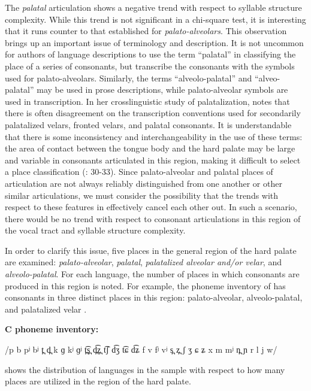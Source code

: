   The \textit{palatal} articulation shows a negative trend with respect to syllable structure complexity. While this trend is not significant in a chi-square test, it is interesting that it runs counter to that established for \textit{palato-alveolars}. This observation brings up an important issue of terminology and description. It is not uncommon for authors of language descriptions to use the term ``palatal'' in classifying the place of a series of consonants, but transcribe the consonants with the symbols used for palato-alveolars. Similarly, the terms ``alveolo-palatal'' and ``alveo-palatal'' may be used in prose descriptions, while palato-alveolar symbols are used in transcription. In her crosslinguistic study of palatalization, \citet{Bateman2007} notes that there is often disagreement on the transcription conventions used for secondarily palatalized velars, fronted velars, and palatal consonants. It is understandable that there is some inconsistency and interchangeability in the use of these terms: the area of contact between the tongue body and the hard palate may be large and variable in consonants articulated in this region, making it difficult to select a place classification (\citealt{LadefogedMaddieson1996}: 30-33). Since palato-alveolar and palatal places of articulation are not always reliably distinguished from one another or other similar articulations, we must consider the possibility that the trends with respect to these features in  effectively cancel each other out. In such a scenario, there would be no trend with respect to consonant articulations in this region of the vocal tract and syllable structure complexity.

  In order to clarify this issue, five places in the general region of the hard palate are examined: \textit{palato-alveolar}, \textit{palatal}, \textit{palatalized alveolar and/or velar}, and \textit{alveolo-palatal}. For each language, the number of places in which consonants are produced in this region is noted. For example, the phoneme inventory of  has consonants in three distinct places in this region: palato-alveolar, alveolo-palatal, and palatalized velar .

\ea\label{ex:4.32}

\textbf{C phoneme inventory:} 

/p b pʲ bʲ t̪ d̪ k ɡ kʲ ɡʲ t̪͡s̪ d̪͡z̪ t͡ʃ d͡ʒ t͡ɕ d͡ʑ f v fʲ vʲ s̪ z̪ ʃ ʒ ɕ ʑ x m mʲ n̪ ɲ r l j w/
\z

   shows the distribution of languages in the sample with respect to how many places are utilized in the region of the hard palate.

